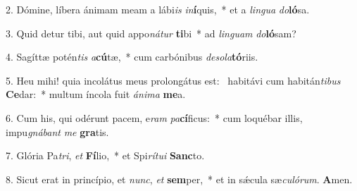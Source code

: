 2. Dómine, líbera ánimam meam a lábi\textit{is} \textit{in}\textbf{í}quis,~*  et a \textit{lin}\textit{gua} \textit{do}\textbf{ló}sa.\

3. Quid detur tibi, aut quid appo\textit{ná}\textit{tur} \textbf{ti}bi~*  ad \textit{lin}\textit{guam} \textit{do}\textbf{ló}sam?\

4. Sagíttæ potén\textit{tis} \textit{a}\textbf{cú}tæ,~*  cum carbónibus \textit{de}\textit{so}\textit{la}\textbf{tó}riis.\

5. Heu mihi! quia incolátus meus prolongátus est: \dag\  habitávi cum habitán\textit{ti}\textit{bus} \textbf{Ce}dar:~*  multum íncola fuit \textit{á}\textit{ni}\textit{ma} \textbf{me}a.\

6. Cum his, qui odérunt pacem, e\textit{ram} \textit{pa}\textbf{cí}ficus:~*  cum loquébar illis, impu\textit{gná}\textit{bant} \textit{me} \textbf{gra}tis.\

7. Glória Pa\textit{tri}, \textit{et} \textbf{Fí}lio,~*  et Spi\textit{rí}\textit{tu}\textit{i} \textbf{Sanc}to.\

8. Sicut erat in princípio, et \textit{nunc}, \textit{et} \textbf{sem}per,~*  et in sǽcula sæ\textit{cu}\textit{ló}\textit{rum}. \textbf{A}men.\


